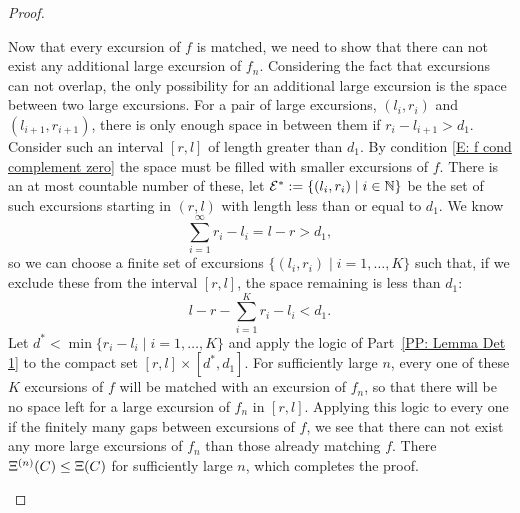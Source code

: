 \begin{proof}
\begin{proofpart} \label{PP: Xin in Xi} \label{PP: Lemma Det 2}
Now that every excursion of $f$ is matched, 
we need to show that there can not exist any additional large excursion of $f_n$.
Considering the fact that excursions can not overlap,
the only possibility for an additional large excursion is the space between two large excursions.
For a pair of large excursions,
$(l_i, r_i)$ and $(l_{i+1}, r_{i+1})$,
there is only enough space in between them if
$r_i - l_{i+1} > d_1$.
Consider such an interval $[r,l]$ of length greater than $d_1$.
By condition \eqref{E: f cond complement zero} the space must be filled with smaller excursions of $f$.
There is an at most countable number of these,
let $\mathcal{E^*} := \{ (l_i, r_i) \; | \; i \in \mathbb{N} \}$
be the set of such excursions starting in $(r,l)$ with length less than or equal to $d_1$.
We know
\begin{equation} 
\sum_{i=1}^{\infty} r_i - l_i = l - r > d_1,
\end{equation}
so we can choose a finite set of excursions
$\{ (l_i, r_i) \; | \; i = 1, \dots, K \}$
such that, 
if we exclude these from the interval $[r,l]$, 
the space remaining is less than $d_1$:
\begin{equation}
l-r - \sum_{i=1}^{K} r_i - l_i < d_1.
\end{equation}
Let $d^* < \min \{ r_i - l_i \; | \; i = 1, \dots, K \}$
and apply the logic of Part~\ref{PP: Lemma Det 1} to the compact set
$[r, l] \times [d^*, d_1]$.
For sufficiently large $n$, 
every one of these $K$ excursions of $f$ will be matched with an excursion of $f_n$,
so that there will be no space left for a large excursion of $f_n$ in $[r,l]$.
Applying this logic to every one if the finitely many gaps between excursions of $f$,
we see that there can not exist any more large excursions of $f_n$  than those already matching $f$.
There $\Xi^{(n)}(C) \leq \Xi(C)$ for sufficiently large $n$, which completes the proof.
\end{proofpart}
\end{proof}



